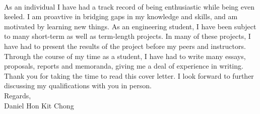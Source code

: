\documentclass[10pt,a4paper]{article}
\begin{document}
\\
\medskip
\hspace{10mm}
As an individual I have had a track record of being enthusiastic while being even keeled. 
I am proavtive in bridging gaps in my knowledge and skills, and am motivated by learning new things.
As an engineering student, I have been subject to many short-term as well as term-length projects.
In many of these projects, I have had to present the results of the project before my peers and instructors.
Through the course of my time as a student, I have had to write many essays, proposals, reports and memoranda, giving me a deal of experience in writing.
Thank you for taking the time to read this cover letter.
I look forward to further discussing my qualifications with you in person.
\\

\bigskip
Regards, \\
Daniel Hon Kit Chong
\end{document}
